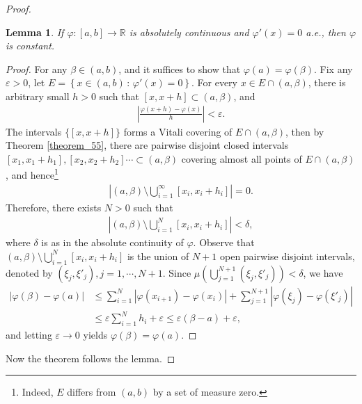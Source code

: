 \documentclass[11pt]{book}
\newtheorem{lemma}{Lemma}[chapter]
\theoremstyle{definition}
\numberwithin{equation}{chapter}
\begin{document}
\begin{proof}
\begin{lemma}
If $\varphi:[a,b] \to \mathbb{R}$ is absolutely continuous and $\varphi'(x) = 0$ a.e., then $\varphi$ is constant.
\end{lemma}
\begin{proof}
For any $\beta \in (a,b)$, and it suffices to show that $\varphi(a) = \varphi(\beta)$. Fix any $\varepsilon > 0$, let $E = \left\{x \in (a,b) \,:\, \varphi'(x) = 0\right\}$. For every $x \in E \cap (a,\beta)$, there is arbitrary small $h > 0$ such that $[x,x+h] \subset (a,\beta)$, and
\begin{align*}
    \left|\frac{\varphi(x+h) - \varphi(x)}{h}\right| < \varepsilon.
\end{align*}
The intervals $\{[x,x+h]\}$ forms a Vitali covering of $E \cap (a,\beta)$, then by Theorem \ref{theorem_55}, there are pairwise disjoint closed intervals $[x_1,x_1+h_1], [x_2,x_2+h_2]\cdots \subset (a,\beta)$ covering almost all points of $E \cap (a,\beta)$, and hence\footnote{Indeed, $E$ differs from $(a,b)$ by a set of measure zero.}
\begin{align*}
    \left|(a,\beta) \setminus \bigcup^\infty_{i=1} [x_i,x_i+h_i]\right| = 0.
\end{align*}
Therefore, there exists $N > 0$ such that 
\begin{align*}
    \left|(a,\beta) \setminus \bigcup^N_{i=1} [x_i,x_i+h_i]\right| < \delta,
\end{align*}
where $\delta$ is as in the absolute continuity of $\varphi$. Observe that $(a,\beta) \setminus \bigcup^N_{i=1} [x_i,x_i+h_i]$ is the union of $N + 1$ open pairwise disjoint intervals, denoted by $(\xi_j,\xi'_j), j = 1,\cdots,N+1$. Since $\mu\left(\bigcup^{N+1}_{j=1} (\xi_j,\xi'_j)\right) < \delta$, we have 
\begin{align*}
    \left|\varphi(\beta) - \varphi(a)\right| & \leq \sum^N_{i=1} \left|\varphi(x_{i+1}) - \varphi(x_{i})\right| + \sum^{N+1}_{j=1} \left|\varphi(\xi_{j}) - \varphi(\xi'_{j})\right| \\
    & \leq \varepsilon \sum^N_{i=1} h_i + \varepsilon \leq \varepsilon (\beta - a) + \varepsilon,
\end{align*}
and letting $\varepsilon \to 0$ yields $\varphi(\beta) = \varphi(a)$.
\end{proof}

Now the theorem follows the lemma.
\end{proof}
\end{document}
